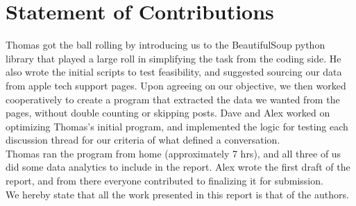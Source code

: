 \documentclass[12pt]{article}
\begin{document}
\section{Statement of Contributions}
Thomas got the ball rolling by introducing us to the BeautifulSoup python library that played a large roll in simplifying the task from the coding side. He also wrote the initial scripts to test feasibility, and suggested sourcing our data from apple tech support pages. Upon agreeing on our objective, we then worked cooperatively to create a program that extracted the data we wanted from the pages, without double counting or skipping posts. Dave and Alex worked on optimizing Thomas's initial program, and implemented the logic for testing each discussion thread for our criteria of what defined a conversation. \\

Thomas ran the program from home (approximately 7 hrs), and all three of us did some data analytics to include in the report. Alex wrote the first draft of the report, and from there everyone contributed to finalizing it for submission.\\

We hereby state that all the work presented in this report is that of the authors.



\end{document}
